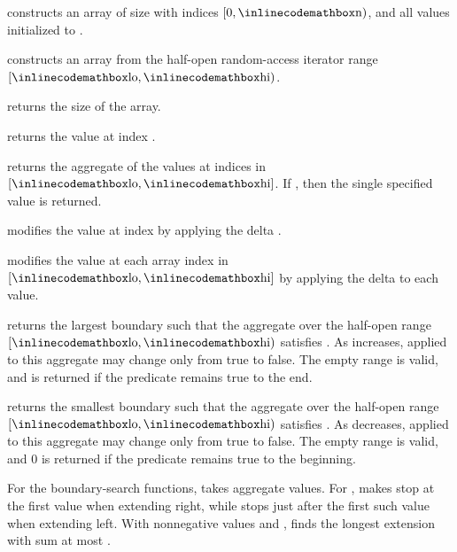 \begin{compactitem}
  \item {} constructs an array of size  with indices $[0, {\inlinecodemath{n}})$, and all values initialized to .
  \item {} constructs an array from the half-open random-access iterator range $[{\inlinecodemath{lo}}, {\inlinecodemath{hi}})$.
  \item {} returns the size of the array.
  \item {} returns the value at index .
  \item {} returns the aggregate of the values at indices in $[{\inlinecodemath{lo}}, {\inlinecodemath{hi}}]$. If , then the single specified value is returned.
  \item {} modifies the value at index  by applying the delta .
  \item {} modifies the value at each array index in $[{\inlinecodemath{lo}}, {\inlinecodemath{hi}}]$ by applying the delta  to each value.
  \item {} returns the largest boundary  such that the aggregate over the half-open range $[{\inlinecodemath{lo}}, {\inlinecodemath{hi}})$ satisfies . As  increases,  applied to this aggregate may change only from true to false. The empty range is valid, and  is returned if the predicate remains true to the end.
  \item {} returns the smallest boundary  such that the aggregate over the half-open range $[{\inlinecodemath{lo}}, {\inlinecodemath{hi}})$ satisfies . As  decreases,  applied to this aggregate may change only from true to false. The empty range is valid, and $0$ is returned if the predicate remains true to the beginning.
\end{compactitem}

For the boundary-search functions,  takes aggregate  values. For ,  makes  stop at the first value  when extending right, while  stops just after the first such value when extending left. With nonnegative values and ,  finds the longest extension with sum at most .

